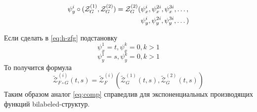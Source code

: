 \begin{equation*}
\begin{split}
\psi_y^i \circ (\mathcal Z^{(1)}_G, \mathcal Z^{(2)}_G ) = \mathcal Z^{(2)}_G
(&\psi_x^i, \psi_x^{2i}, \psi_x^{3i}, \dots, \\
&\psi_y^i, \psi_y^{2i}, \psi_y^{3i}, \dots)
\end{split}
\end{equation*}

\begin{remark}
Если сделать в \ref{eq:h-zfg} подстановку 
$$
\psi_{x}^1 = t, \psi_{x}^k = 0, k>1
$$
$$
\psi_y^1 = s, \psi_y^k = 0, k>1
$$
То получится формула
$$
\tilde{\mathcal Z}^{(i)}_{F \circ G} (t, s) = 
	\tilde{\mathcal Z}_F^{(i)} (
		\tilde{\mathcal Z}_G^{(1)} (t, s), 
		\tilde{\mathcal Z}_G^{(2)} (t, s))
$$
Таким образом аналог \ref{eq:comp} справедлив для
экспоненциальных производящих функций bilabeled-структур.
\end{remark}

